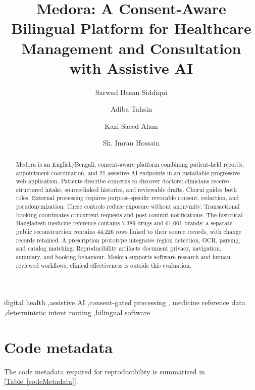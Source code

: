 \documentclass[preprint,12pt,a4paper]{elsarticle}
\begin{document}
\begin{frontmatter}

\title{Medora: A Consent-Aware Bilingual Platform for Healthcare Management and Consultation with Assistive AI}

\author{Sarwad Hasan Siddiqui}
\author{Adiba Tahsin}
\author{Kazi Saeed Alam}
\author{Sk. Imran Hossain}
\address{Department of Computer Science and Engineering, Khulna University of Engineering \& Technology, Khulna 9203, Bangladesh}

\begin{abstract}
Medora is an English/Bengali, consent-aware platform combining patient-held records,
appointment coordination, and 21 assistive-AI endpoints in an installable progressive web
application. Patients describe concerns to discover doctors; clinicians receive
structured intake, source-linked histories, and reviewable drafts.
Chorui guides both roles. External processing requires
purpose-specific revocable consent, redaction, and pseudonymization. These controls reduce
exposure without anonymity. Transactional booking
coordinates concurrent requests and post-commit notifications. The historical Bangladesh
medicine reference contains 7,389 drugs and 67,001 brands; a separate public reconstruction
contains 44,226 rows linked to their source records, with change records retained. A
prescription prototype integrates region detection,
OCR, parsing, and catalog matching. Reproducibility artifacts document privacy, navigation,
summary, and booking behaviour. Medora supports software research and human-reviewed
workflows; clinical effectiveness is outside this evaluation.

\end{abstract}

\begin{keyword}
digital health \sep assistive AI \sep consent-gated processing \sep
medicine reference data \sep deterministic intent routing \sep bilingual software
\end{keyword}
\end{frontmatter}

\section*{Code metadata}
The code metadata required for reproducibility is summarized in [\hyperref[codeMetadata]{Table~\ref*{codeMetadata}}].
\end{document}
